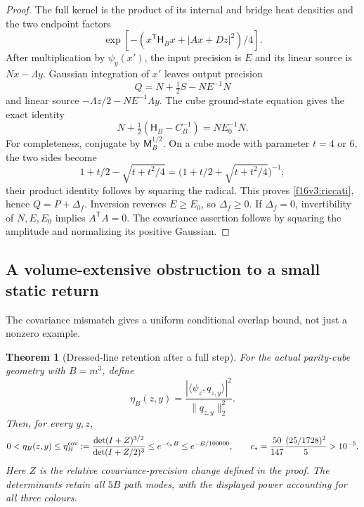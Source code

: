 \documentclass[11pt,oneside]{article}
\newtheorem{theorem}{Theorem}[section]
\begin{document}
\begin{proof}
The full kernel is the product of its internal and bridge heat
densities and the two endpoint factors
\[
 \exp[-(x^{\mathsf T}\mathsf H_Bx+|Ax+Dz|^2)/4].
\]
After multiplication by \(\psi_y(x')\), the input precision is \(E\)
and its linear source is \(Nx-\Lambda y\).
Gaussian integration of \(x'\) leaves output precision
\[
 Q=N+\tfrac12S-NE^{-1}N
\]
and linear source \(-\Lambda z/2-NE^{-1}\Lambda y\).
The cube ground-state equation gives the exact identity
\begin{equation}
 N+\tfrac12(\mathsf H_B-C_B^{-1})=NE_0^{-1}N.
 \label{f16v3:riccati}
\end{equation}
For completeness, conjugate by \(\mathsf M_B^{1/2}\).
On a cube mode with parameter \(t=4\) or \(6\), the two sides
become
\[
 1+t/2-\sqrt{t+t^2/4}
       =\bigl(1+t/2+\sqrt{t+t^2/4}\bigr)^{-1};
\]
their product identity follows by squaring the radical.
This proves \eqref{f16v3:riccati}, hence \(Q=P+\Delta_f\).
Inversion reverses \(E\ge E_0\), so \(\Delta_f\ge0\).
If \(\Delta_f=0\), invertibility of \(N,E,E_0\) implies
\(A^{\mathsf T}A=0\). The covariance assertion follows by squaring
the amplitude and normalizing its positive Gaussian.
\end{proof}

\subsection{A volume-extensive obstruction to a small static return}

The covariance mismatch gives a uniform conditional overlap
bound, not just a nonzero example.

\begin{theorem}[Dressed-line retention after a full step]
\label{f16v3:retention}
For the actual parity-cube geometry with \(B=m^3\), define
\[
 \eta_B(z,y)=
       \frac{|\langle\psi_z,q_{z,y}\rangle|^2}
            {\|q_{z,y}\|_2^2}.
\]
Then, for every \(y,z\),
\begin{equation}
 0<\eta_B(z,y)\le
 \eta_B^{\rm cov}:=
 \frac{\det(I+Z)^{3/2}}{\det(I+Z/2)^3}
 \le e^{-c_*B}\le e^{-B/100000},
 \qquad
 c_*=\frac{50}{147}\frac{(25/1728)^2}{5}>10^{-5}.
 \label{f16v3:retention-bound}
\end{equation}
Here \(Z\) is the relative covariance-precision change defined
in the proof. The determinants retain all \(5B\) path modes,
with the displayed power accounting for all three colours.
\end{theorem}
\end{document}
